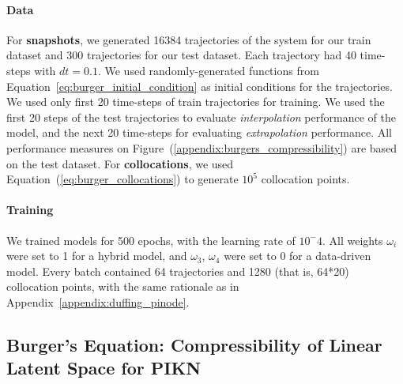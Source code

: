 \paragraph{Data}For \textbf{snapshots}, we generated 16384 trajectories of the system for our train dataset and 300 trajectories for our test dataset. Each trajectory had 40 time-steps with $dt = 0.1$. We used randomly-generated functions from Equation~\ref{eq:burger_initial_condition} as initial conditions for the trajectories. We used only first 20 time-steps of train trajectories for training. We used the first 20 steps of the test trajectories to evaluate \textit{interpolation} performance of the model, and the next 20 time-steps for evaluating \textit{extrapolation} performance. All performance measures on Figure~(\ref{appendix:burgers_compressibility}) are based on the test dataset.
For \textbf{collocations}, we used Equation~(\ref{eq:burger_collocations}) to generate $10^5$ collocation points. 
\paragraph{Training} We trained models for 500 epochs, with the learning rate of $10^-4$. All weights $\omega_i$ were set to 1 for a hybrid model, and $\omega_3$, $\omega_4$ were set to 0 for a data-driven model. Every batch contained 64 trajectories and 1280 (that is, 64*20) collocation points, with the same rationale as in Appendix~\ref{appendix:duffing_pinode}.

\subsection{Burger's Equation: Compressibility of Linear Latent Space for PIKN}
\label{appendix:pikn_burgers}

